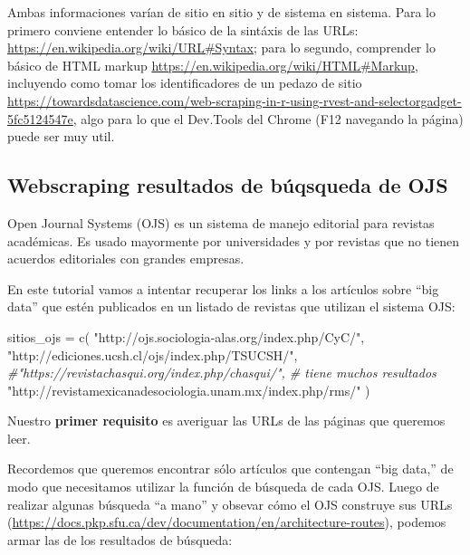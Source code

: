 \documentclass[
]{book}
\newenvironment{Shaded}{\begin{snugshade}}{\end{snugshade}}
\newcommand{\CommentTok}[1]{\textcolor[rgb]{0.56,0.35,0.01}{\textit{#1}}}
\newcommand{\FunctionTok}[1]{\textcolor[rgb]{0.00,0.00,0.00}{#1}}
\newcommand{\NormalTok}[1]{#1}
\newcommand{\OtherTok}[1]{\textcolor[rgb]{0.56,0.35,0.01}{#1}}
\newcommand{\StringTok}[1]{\textcolor[rgb]{0.31,0.60,0.02}{#1}}
\begin{document}
Ambas informaciones varían de sitio en sitio y de sistema en sistema. Para lo primero conviene entender lo básico de la sintáxis de las URLs: \url{https://en.wikipedia.org/wiki/URL\#Syntax}; para lo segundo, comprender lo básico de HTML markup \url{https://en.wikipedia.org/wiki/HTML\#Markup}, incluyendo como tomar los identificadores de un pedazo de sitio \url{https://towardsdatascience.com/web-scraping-in-r-using-rvest-and-selectorgadget-5fc5124547e}, algo para lo que el Dev.Tools del Chrome (F12 navegando la página) puede ser muy util.

\hypertarget{webscraping-resultados-de-buxfaqsqueda-de-ojs}{%
\subsection{Webscraping resultados de búqsqueda de OJS}\label{webscraping-resultados-de-buxfaqsqueda-de-ojs}}

Open Journal Systems (OJS) es un sistema de manejo editorial para revistas académicas. Es usado mayormente por universidades y por revistas que no tienen acuerdos editoriales con grandes empresas.

En este tutorial vamos a intentar recuperar los links a los artículos sobre ``big data'' que estén publicados en un listado de revistas que utilizan el sistema OJS:

\begin{Shaded}
\begin{Highlighting}[]
\NormalTok{sitios\_ojs }\OtherTok{=} \FunctionTok{c}\NormalTok{(}
  \StringTok{"http://ojs.sociologia{-}alas.org/index.php/CyC/"}\NormalTok{,}
  \StringTok{"http://ediciones.ucsh.cl/ojs/index.php/TSUCSH/"}\NormalTok{,}
  \CommentTok{\#"https://revistachasqui.org/index.php/chasqui/", \# tiene muchos resultados}
  \StringTok{"http://revistamexicanadesociologia.unam.mx/index.php/rms/"}
\NormalTok{  )}
\end{Highlighting}
\end{Shaded}

Nuestro \textbf{primer requisito} es averiguar las URLs de las páginas que queremos leer.

Recordemos que queremos encontrar sólo artículos que contengan ``big data,'' de modo que necesitamos utilizar la función de búsqueda de cada OJS. Luego de realizar algunas búsqueda ``a mano'' y obsevar cómo el OJS construye sus URLs (\url{https://docs.pkp.sfu.ca/dev/documentation/en/architecture-routes}), podemos armar las de los resultados de búsqueda:
\end{document}
